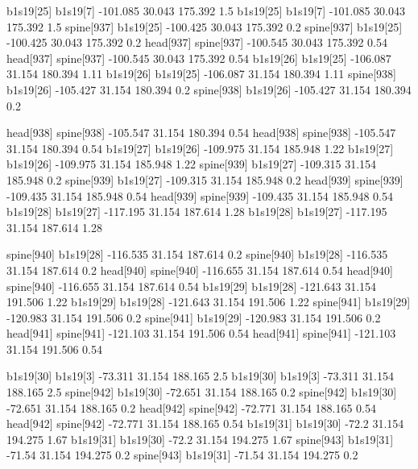 b1s19[25]    b1s19[7]    -101.085    30.043    175.392    1.5
b1s19[25]    b1s19[7]    -101.085    30.043    175.392    1.5
spine[937]    b1s19[25]    -100.425    30.043    175.392    0.2
spine[937]    b1s19[25]    -100.425    30.043    175.392    0.2
head[937]    spine[937]    -100.545    30.043    175.392    0.54
head[937]    spine[937]    -100.545    30.043    175.392    0.54
b1s19[26]    b1s19[25]    -106.087    31.154    180.394    1.11
b1s19[26]    b1s19[25]    -106.087    31.154    180.394    1.11
spine[938]    b1s19[26]    -105.427    31.154    180.394    0.2
spine[938]    b1s19[26]    -105.427    31.154    180.394    0.2


head[938]    spine[938]    -105.547    31.154    180.394    0.54
head[938]    spine[938]    -105.547    31.154    180.394    0.54
b1s19[27]    b1s19[26]    -109.975    31.154    185.948    1.22
b1s19[27]    b1s19[26]    -109.975    31.154    185.948    1.22
spine[939]    b1s19[27]    -109.315    31.154    185.948    0.2
spine[939]    b1s19[27]    -109.315    31.154    185.948    0.2
head[939]    spine[939]    -109.435    31.154    185.948    0.54
head[939]    spine[939]    -109.435    31.154    185.948    0.54
b1s19[28]    b1s19[27]    -117.195    31.154    187.614    1.28
b1s19[28]    b1s19[27]    -117.195    31.154    187.614    1.28


spine[940]    b1s19[28]    -116.535    31.154    187.614    0.2
spine[940]    b1s19[28]    -116.535    31.154    187.614    0.2
head[940]    spine[940]    -116.655    31.154    187.614    0.54
head[940]    spine[940]    -116.655    31.154    187.614    0.54
b1s19[29]    b1s19[28]    -121.643    31.154    191.506    1.22
b1s19[29]    b1s19[28]    -121.643    31.154    191.506    1.22
spine[941]    b1s19[29]    -120.983    31.154    191.506    0.2
spine[941]    b1s19[29]    -120.983    31.154    191.506    0.2
head[941]    spine[941]    -121.103    31.154    191.506    0.54
head[941]    spine[941]    -121.103    31.154    191.506    0.54


b1s19[30]    b1s19[3]    -73.311    31.154    188.165    2.5
b1s19[30]    b1s19[3]    -73.311    31.154    188.165    2.5
spine[942]    b1s19[30]    -72.651    31.154    188.165    0.2
spine[942]    b1s19[30]    -72.651    31.154    188.165    0.2
head[942]    spine[942]    -72.771    31.154    188.165    0.54
head[942]    spine[942]    -72.771    31.154    188.165    0.54
b1s19[31]    b1s19[30]    -72.2    31.154    194.275    1.67
b1s19[31]    b1s19[30]    -72.2    31.154    194.275    1.67
spine[943]    b1s19[31]    -71.54    31.154    194.275    0.2
spine[943]    b1s19[31]    -71.54    31.154    194.275    0.2


